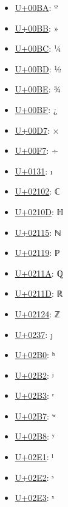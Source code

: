 \begin{itemize}
	\item \href{https://www.compart.com/en/unicode/U+00BA}{U+00BA}: º
	\item \href{https://www.compart.com/en/unicode/U+00BB}{U+00BB}: »
	\item \href{https://www.compart.com/en/unicode/U+00BC}{U+00BC}: ¼
	\item \href{https://www.compart.com/en/unicode/U+00BD}{U+00BD}: ½
	\item \href{https://www.compart.com/en/unicode/U+00BE}{U+00BE}: ¾
	\item \href{https://www.compart.com/en/unicode/U+00BF}{U+00BF}: ¿
	\item \href{https://www.compart.com/en/unicode/U+00D7}{U+00D7}: ×
	\item \href{https://www.compart.com/en/unicode/U+00F7}{U+00F7}: ÷
	\item \href{https://www.compart.com/en/unicode/U+0131}{U+0131}: ı
	\item \href{https://www.compart.com/en/unicode/U+02102}{U+02102}: ℂ
	\item \href{https://www.compart.com/en/unicode/U+0210D}{U+0210D}: ℍ
	\item \href{https://www.compart.com/en/unicode/U+02115}{U+02115}: ℕ
	\item \href{https://www.compart.com/en/unicode/U+02119}{U+02119}: ℙ
	\item \href{https://www.compart.com/en/unicode/U+0211A}{U+0211A}: ℚ
	\item \href{https://www.compart.com/en/unicode/U+0211D}{U+0211D}: ℝ
	\item \href{https://www.compart.com/en/unicode/U+02124}{U+02124}: ℤ
	\item \href{https://www.compart.com/en/unicode/U+0237}{U+0237}: ȷ
	\item \href{https://www.compart.com/en/unicode/U+02B0}{U+02B0}: ʰ
	\item \href{https://www.compart.com/en/unicode/U+02B2}{U+02B2}: ʲ
	\item \href{https://www.compart.com/en/unicode/U+02B3}{U+02B3}: ʳ
	\item \href{https://www.compart.com/en/unicode/U+02B7}{U+02B7}: ʷ
	\item \href{https://www.compart.com/en/unicode/U+02B8}{U+02B8}: ʸ
	\item \href{https://www.compart.com/en/unicode/U+02E1}{U+02E1}: ˡ
	\item \href{https://www.compart.com/en/unicode/U+02E2}{U+02E2}: ˢ
	\item \href{https://www.compart.com/en/unicode/U+02E3}{U+02E3}: ˣ

\end{itemize}
